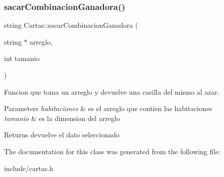 \subsubsection{\texorpdfstring{sacar\+Combinacion\+Ganadora()}{sacarCombinacionGanadora()}}
{\footnotesize\ttfamily string Cartas\+::sacar\+Combinacion\+Ganadora (\begin{DoxyParamCaption}\item[{string $\ast$}]{arreglo,  }\item[{int}]{tamanio }\end{DoxyParamCaption})\hspace{0.3cm}{\ttfamily [inline]}}



Funcion que toma un arreglo y devuelve una casilla del mismo al azar. 


\begin{DoxyParams}{Parameters}
{\em habitaciones} & es el arreglo que contien las habitaciones \\
\hline
{\em tamanio} & es la dimension del arreglo \\
\hline
\end{DoxyParams}
\begin{DoxyReturn}{Returns}
devuelve el dato seleccionado 
\end{DoxyReturn}


The documentation for this class was generated from the following file\+:\begin{DoxyCompactItemize}
\item 
include/cartas.\+h\end{DoxyCompactItemize}
